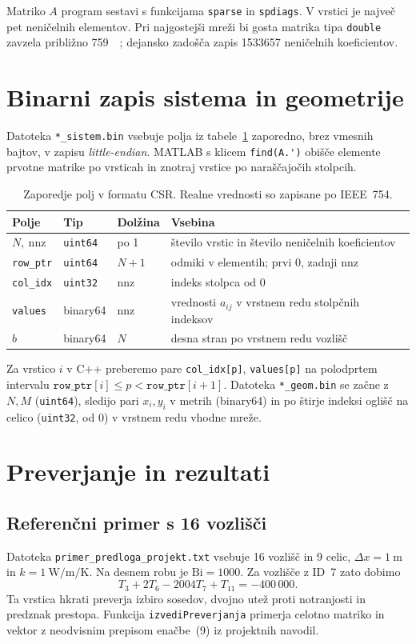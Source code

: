 \documentclass[a4paper,11pt]{article}
\begin{document}
Matriko \(A\) program sestavi s funkcijama \texttt{sparse} in \texttt{spdiags}. V vrstici je največ pet neničelnih elementov. Pri najgostejši mreži bi gosta matrika tipa \texttt{double} zavzela približno \SI{759}{\giga\byte}; dejansko zadošča zapis \num{1533657} neničelnih koeficientov.

\section{Binarni zapis sistema in geometrije}
Datoteka \texttt{*\_sistem.bin} vsebuje polja iz tabele~\ref{tab:csr} zaporedno, brez vmesnih bajtov, v zapisu \textit{little-endian}. MATLAB s klicem \verb|find(A.')| obišče elemente prvotne matrike po vrsticah in znotraj vrstice po naraščajočih stolpcih.
\begin{table}[ht]
\centering\small
\begin{tabular}{@{}llll@{}}
\toprule
Polje & Tip & Dolžina & Vsebina \\ \midrule
\(N,\ \mathrm{nnz}\) & \texttt{uint64} & po 1 & število vrstic in število neničelnih koeficientov\\
\texttt{row\_ptr} & \texttt{uint64} & \(N+1\) & odmiki v elementih; prvi 0, zadnji \(\mathrm{nnz}\)\\
\texttt{col\_idx} & \texttt{uint32} & \(\mathrm{nnz}\) & indeks stolpca od 0\\
\texttt{values} & binary64 & \(\mathrm{nnz}\) & vrednosti \(a_{ij}\) v vrstnem redu stolpčnih indeksov\\
\(b\) & binary64 & \(N\) & desna stran po vrstnem redu vozlišč\\
\bottomrule
\end{tabular}
\caption{Zaporedje polj v formatu CSR. Realne vrednosti so zapisane po IEEE~754.}
\label{tab:csr}
\end{table}

Za vrstico \(i\) v C++ preberemo pare \texttt{col\_idx[p]}, \texttt{values[p]} na polodprtem intervalu \(\texttt{row\_ptr}[i]\le p<\texttt{row\_ptr}[i+1]\). Datoteka \texttt{*\_geom.bin} se začne z \(N,M\) (\texttt{uint64}), sledijo pari \(x_i,y_i\) v metrih (binary64) in po štirje indeksi oglišč na celico (\texttt{uint32}, od 0) v vrstnem redu vhodne mreže.


\section{Preverjanje in rezultati}
\subsection{Referenčni primer s 16 vozlišči}
Datoteka \texttt{primer\_predloga\_projekt.txt} vsebuje 16 vozlišč in 9 celic, \(\Delta x=\SI{1}{\metre}\) in \(k=\SI{1}{\watt\per\metre\per\kelvin}\). Na desnem robu je \(\mathrm{Bi}=1000\). Za vozlišče z ID~7 zato dobimo
\[
T_3+2T_6-2004T_7+T_{11}=-400\,000.
\]
Ta vrstica hkrati preverja izbiro sosedov, dvojno utež proti notranjosti in predznak prestopa. Funkcija \texttt{izvediPreverjanja} primerja celotno matriko in vektor z neodvisnim prepisom enačbe~(9) iz projektnih navodil.
\end{document}
